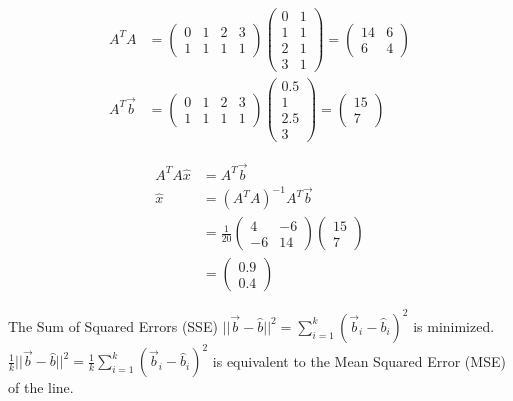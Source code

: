 \begin{align}
    A^T A &= \begin{pmatrix}
        0 & 1 & 2 & 3 \\ 1 & 1 & 1 & 1
    \end{pmatrix} \begin{pmatrix}
        0 & 1 \\ 1 & 1 \\ 2 & 1 \\ 3 & 1
    \end{pmatrix} = \begin{pmatrix}
        14 & 6 \\ 6 & 4
    \end{pmatrix} \\
    A^T \Vec{b} &= \begin{pmatrix}
        0 & 1 & 2 & 3 \\ 1 & 1 & 1 & 1
    \end{pmatrix} \begin{pmatrix}
        0.5 \\ 1 \\ 2.5 \\ 3
    \end{pmatrix} = \begin{pmatrix}
        15 \\ 7
    \end{pmatrix}
\end{align}

\begin{align}
    A^T A \hat{x} &= A^T \Vec{b} \\
    \hat{x} &= (A^T A)^{-1} A^T \Vec{b} \\
    &= \frac{1}{20} \begin{pmatrix}
        4 & -6 \\
        -6 & 14
    \end{pmatrix} \begin{pmatrix}
        15 \\ 7
    \end{pmatrix} \\
    &= \begin{pmatrix}
        0.9 \\ 0.4
    \end{pmatrix}
\end{align}

\noindent
The Sum of Squared Errors (SSE) \(||\Vec{b}-\hat{b}||^2=\sum_{i=1}^k (\Vec{b}_i - \hat{b}_i)^2\) is minimized. \(\frac{1}{k}||\Vec{b}-\hat{b}||^2=\frac{1}{k}\sum_{i=1}^k (\Vec{b}_i - \hat{b}_i)^2\) is equivalent to the Mean Squared Error (MSE) of the line.

